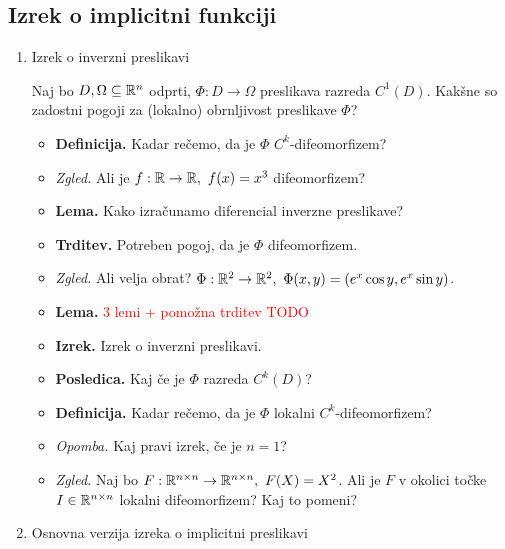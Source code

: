 \newpage
\subsection{Izrek o implicitni funkciji}
\begin{enumerate}
    \item Izrek o inverzni preslikavi
    
    Naj bo $D, \Omega \subseteq \mathbb{R}^n$ odprti, $\Phi: D \to \Omega$ preslikava razreda $C^1(D)$. Kakšne so zadostni pogoji za (lokalno) obrnljivost preslikave $\Phi$?
    
    \begin{itemize}
        \item \colorbox{purple!30}{\textbf{Definicija.}} Kadar rečemo, da je $\Phi$ $C^k$-difeomorfizem?
        \item \colorbox{yellow!30}{\emph{Zgled.}} Ali je $f: \mathbb{R} \to \mathbb{R}, \ f(x) = x^3$ difeomorfizem?
        \item \colorbox{blue!30}{\textbf{Lema.}} Kako izračunamo diferencial inverzne preslikave?
        \item \colorbox{blue!30}{\textbf{Trditev.}} Potreben pogoj, da je $\Phi$ difeomorfizem.
        \item \colorbox{yellow!30}{\emph{Zgled.}} Ali velja obrat? $\Phi: \R^2 \to \R^2, \ \Phi(x,y) = (e^x \cos y, e^x \sin y)$.
        \item \colorbox{blue!30}{\textbf{Lema.}} \textcolor{red}{3 lemi + pomožna trditev TODO}
        \item \colorbox{blue!30}{\textbf{Izrek.}} Izrek o inverzni preslikavi.
        \item \colorbox{orange!30}{\textbf{Posledica.}} Kaj če je $\Phi$ razreda $C^k(D)$?
        \item \colorbox{purple!30}{\textbf{Definicija.}} Kadar rečemo, da je $\Phi$ lokalni $C^k$-difeomorfizem?
        \item \colorbox{yellow!30}{\emph{Opomba.}} Kaj pravi izrek, če je $n = 1$?
        \item \colorbox{yellow!30}{\emph{Zgled.}}  Naj bo $F: \mathbb{R}^{n \times n} \to \mathbb{R}^{n \times n}, \ F(X) = X^2$. Ali je $F$ v okolici točke $I \in \mathbb{R}^{n \times n}$ lokalni difeomorfizem? Kaj to pomeni?
    \end{itemize}
    

    \item Osnovna verzija izreka o implicitni preslikavi
    

\end{enumerate}
